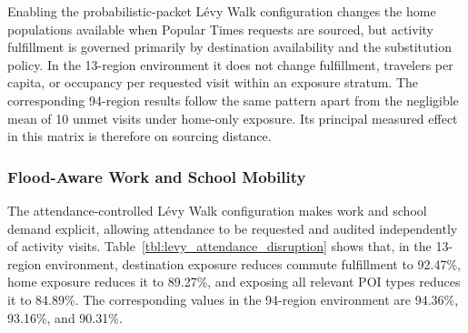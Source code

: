 Enabling the probabilistic-packet L\'evy Walk configuration changes the home populations available when Popular Times requests are sourced, but activity fulfillment is governed primarily by destination availability and the substitution policy. In the 13-region environment it does not change fulfillment, travelers per capita, or occupancy per requested visit within an exposure stratum. The corresponding 94-region results follow the same pattern apart from the negligible mean of 10 unmet visits under home-only exposure. Its principal measured effect in this matrix is therefore on sourcing distance.

\subsubsection{Flood-Aware Work and School Mobility}

The attendance-controlled L\'evy Walk configuration makes work and school demand explicit, allowing attendance to be requested and audited independently of activity visits. Table~\ref{tbl:levy_attendance_disruption} shows that, in the 13-region environment, destination exposure reduces commute fulfillment to 92.47\%, home exposure reduces it to 89.27\%, and exposing all relevant POI types reduces it to 84.89\%. The corresponding values in the 94-region environment are 94.36\%, 93.16\%, and 90.31\%.

